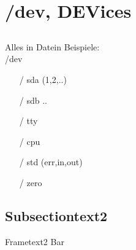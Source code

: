 \section[/dev]{/dev, DEVices}
\subsection{}
\begin{frame}{Alles in Datein}
Beispiele:\\
/dev
\begin{itemize}
 \item [/] sda (1,2,..)
 \item [/] sdb ..
 \item [/] tty
 \item [/] cpu
 \item [/] std (err,in,out)
 \item [/] zero
\end{itemize}

\end{frame}

\subsection{Subsectiontext2}
\begin{frame}{Frametext2}
Bar
\end{frame}